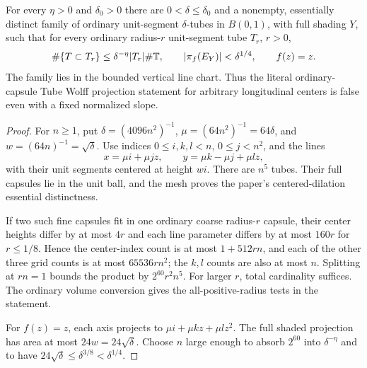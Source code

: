 \begin{theorem}
\label{thm:twisted-longitudinal-obstruction}
\leanok
{}
For every $\eta>0$ and $\delta_0>0$ there are
$0<\delta\leq\delta_0$ and a nonempty, essentially distinct family of
ordinary unit-segment $\delta$-tubes in $B(0,1)$, with full shading $Y$,
such that for every ordinary radius-$r$ unit-segment tube $T_r$, $r>0$,
\[
 \#\{T\subset T_r\}\leq\delta^{-\eta}|T_r|\#\mathbb{T},
 \qquad |\pi_f(E_Y)|<\delta^{1/4},\qquad f(z)=z.
\]
The family lies in the bounded vertical line chart. Thus the literal
ordinary-capsule Tube Wolff projection statement for arbitrary
longitudinal centers is false even with a fixed normalized slope.
\end{theorem}
\begin{proof}
\leanok
For $n\geq1$, put $\delta=(4096n^2)^{-1}$,
$\mu=(64n^2)^{-1}=64\delta$, and $w=(64n)^{-1}=\sqrt\delta$.
Use indices $0\leq i,k,l<n$, $0\leq j<n^2$, and the lines
\[
 x=\mu i+\mu jz,\qquad y=\mu k-\mu j+\mu lz,
\]
with their unit segments centered at height $wi$. There are $n^5$ tubes.
Their full capsules lie in the unit ball, and the mesh proves the paper's
centered-dilation essential distinctness.

If two such fine capsules fit in one ordinary coarse radius-$r$ capsule,
their center heights differ by at most $4r$ and each line parameter
differs by at most $160r$ for $r\leq1/8$. Hence the center-index count is
at most $1+512rn$, and each of the other three grid counts is at most
$65536rn^2$; the $k,l$ counts are also at most $n$.
Splitting at $rn=1$ bounds the product by $2^{60}r^2n^5$.
For larger $r$, total cardinality suffices. The ordinary volume conversion
gives the all-positive-radius tests in the statement.

For $f(z)=z$, each axis projects to
$\mu i+\mu kz+\mu lz^2$. The full shaded projection has area at most
$24w=24\sqrt\delta$. Choose $n$ large enough to absorb $2^{60}$ into
$\delta^{-\eta}$ and to have
$24\sqrt\delta\leq\delta^{3/8}<\delta^{1/4}$.
\end{proof}

